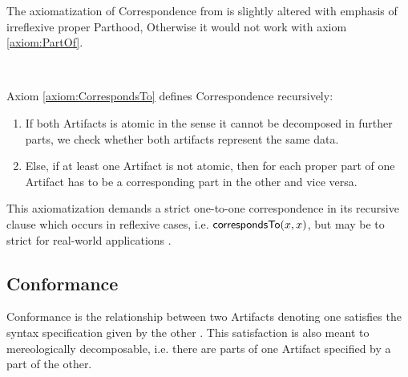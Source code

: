 The axiomatization of \gls{Correspondence} from \cite{HeinzLV17} is slightly altered with emphasis of irreflexive proper \gls{Parthood}, Otherwise it would not work with axiom \ref{axiom:PartOf}.
\begin{axiom}[\correspondsTo]
\label{axiom:CorrespondsTo}
~\newline
{}
\end{axiom}
Axiom \ref{axiom:CorrespondsTo} defines \gls{Correspondence} recursively:
\begin{enumerate}[align=left,label=\textbf{Case \Roman*},ref={\Roman*}]
\item
If both \glspl{Artifact} is atomic in the sense it cannot be decomposed in further parts, we check whether both artifacts represent the same data.

\item
Else, if at least one \gls{Artifact} is not atomic, then for each proper part of one \gls{Artifact} has to be a corresponding part in the other and vice versa.
\end{enumerate}
This axiomatization demands a strict one-to-one correspondence in its recursive clause which occurs in reflexive cases, i.e. $\textsf{correspondsTo}(x,x)$, but may be to strict for real-world applications \cite{DBLP:conf/sle/Lammel16}.

\subsection{Conformance}
\label{subsection:Conformance}
\Gls{Conformance} is the relationship between two \glspl{Artifact} denoting one satisfies the syntax specification given by the other \cite{HeinzLV17}.
This satisfaction is also meant to mereologically decomposable, i.e. there are parts of one \gls{Artifact} specified by a part of the other.


